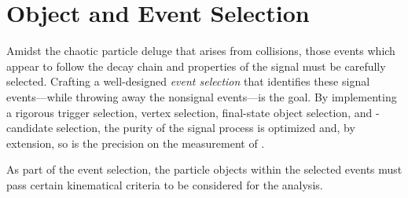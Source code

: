 \section{Object and Event Selection}
\label{sec:evt_sel}
Amidst the chaotic particle deluge that arises from \pp collisions, those events which appear to follow the decay chain and properties of the \hzzfourl signal must be carefully selected.
Crafting a well-designed \emph{event selection} that identifies these signal events---while throwing away the nonsignal events---is the goal.
By implementing a rigorous trigger selection,
vertex selection,
final-state object selection,
and \ZZ-candidate selection,
the purity of the signal process is optimized and, by extension, so is the precision on the measurement of \mH.

As part of the event selection, the particle objects within the selected events must pass certain kinematical criteria to be considered for the analysis.

